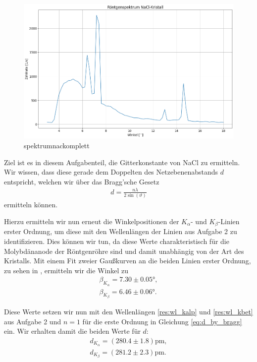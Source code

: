 \begin{figure}[H]
  \centering
  \includegraphics[width=.9\textwidth]{files/plots/spektrum_nacl_komplett.png}
  \caption{spektrumnackomplett}
  \label{fig:spektrum_nacl_komplett}
\end{figure}

Ziel ist es in diesem Aufgabenteil, die Gitterkonstante von NaCl zu ermitteln. Wir wissen, dass diese gerade dem Doppelten des Netzebenenabstands $d$ entspricht, welchen wir über das Bragg'sche Gesetz 
\begin{align}
  d = \frac{n \lambda}{2 \sin(\vartheta)}\label{eq:d_by_bragg}
\end{align}
ermitteln können.

Hierzu ermitteln wir nun erneut die Winkelpositionen der $K_{\alpha}$- und $K_{\beta}$-Linien erster Ordnung, um diese mit den Wellenlängen der Linien aus Aufgabe 2 zu identifizieren. Dies können wir tun, da diese Werte charakteristisch für die Molybdänanode der Röntgenröhre sind und damit unabhängig von der Art des Kristalls. Mit einem Fit zweier Gaußkurven an die beiden Linien erster Ordnung, zu sehen in , ermitteln wir die Winkel zu
\begin{align}
  \beta_{K_{\alpha}} = 7.30 \pm 0.05\si{\degree},\\[0.5em]
  \beta_{K_{\beta}} = 6.46 \pm 0.06\si{\degree}.
\end{align}

Diese Werte setzen wir nun mit den Wellenlängen \eqref{res:wl_kalp} und \eqref{res:wl_kbet} aus Aufgabe 2 und $n = 1$ für die erste Ordnung in Gleichung \eqref{eq:d_by_bragg} ein. Wir erhalten damit die beiden Werte für $d$:
\begin{align}
  d_{K_{\alpha}} = (280.4 \pm 1.8)\si{\pico\meter},\\[0.5em]
  d_{K_{\beta}} =(281.2 \pm 2.3)\si{\pico\meter}.
\end{align}

